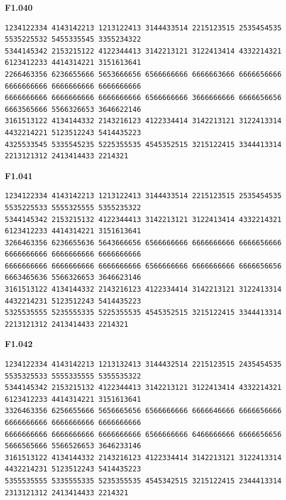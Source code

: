 \noindent\begin{minipage}{\linewidth}\textbf{F1.040}
\begin{lstlisting}
1234122334 4143142213 1213122413 3144433514 2215123515 2535454535 5535225532 5455335545 3355234322
5344145342 2153215122 4122344413 3142213121 3122413414 4332214321 6123412233 4414314221 3151613641
2266463356 6236655666 5653666656 6566666666 6666663666 6666656666 6666666666 6666666666 6666666666
6666666666 6666666666 6666666666 6566666666 3666666666 6666656656 6663565666 5566326653 3646622146
3161513122 4134144332 2143216123 4122334414 3142213121 3122413314 4432214221 5123512243 5414435223
4325533545 5335545235 5225355535 4545352515 3215122415 3344413314 2213121312 2413414433 2214321
\end{lstlisting}
\end{minipage}\par\smallskip

\noindent\begin{minipage}{\linewidth}\textbf{F1.041}
\begin{lstlisting}
1234122334 4143142213 1213122413 3144433514 2215123515 2535454535 5535225533 5555325555 5355235322
5344145342 2153215132 4122344413 3142213121 3122413414 4332214321 6123412233 4414314221 3151613641
3266463356 6236655636 5643666656 6566666666 6666666666 6666656666 6666666666 6666666666 6666666666
6666666666 6666666666 6666666666 6566666666 6666666666 6666656656 6663465636 5566326653 3646623146
3161513122 4134144332 2143216123 4122334414 3142213121 3122413314 4432214231 5123512243 5414435223
5325535555 5235555335 5225355535 4545352515 3215122415 3344413314 2213121312 2413414433 2214321
\end{lstlisting}
\end{minipage}\par\smallskip

\noindent\begin{minipage}{\linewidth}\textbf{F1.042}
\begin{lstlisting}
1234122334 4143142213 1213132413 3144432514 2215123515 2435454535 5535325533 5555335555 5355535322
5344145342 2153215132 4122344413 3142213121 3122413414 4332214321 6123412233 4414314221 3151613641
3326463356 6256655666 5656665656 6566666666 6666646666 6666656666 6666666666 6666666666 6666666666
6666666666 6666666666 6666666666 6566666666 6466666666 6666656656 5666565666 5566526653 3646233146
3161513122 4134144332 2143216123 4122334414 3142213121 3122413314 4432214231 5123512243 5414435223
5355535555 5335555335 5235355535 4545342515 3215122415 2344413314 2313121312 2413414433 2214321
\end{lstlisting}
\end{minipage}\par\smallskip


